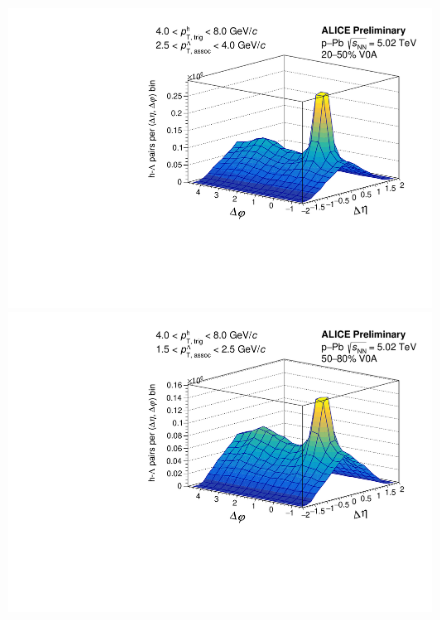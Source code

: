 \begin{figure}[ht]
\begin{minipage}{0.48\textwidth}
	\end{minipage}
	\begin{minipage}{0.48\textwidth}
		\includegraphics[width=\textwidth]{figures/analysis/h_lambda_2d_nomixcor_fancy_label_20_50_highpt.pdf}
	\end{minipage}
	\begin{minipage}{0.48\textwidth}
		\includegraphics[width=\textwidth]{figures/analysis/h_lambda_2d_nomixcor_fancy_label_50_80_lowpt.pdf}
	\end{minipage}
	\begin{minipage}{0.48\textwidth}

\end{minipage}
\end{figure}
